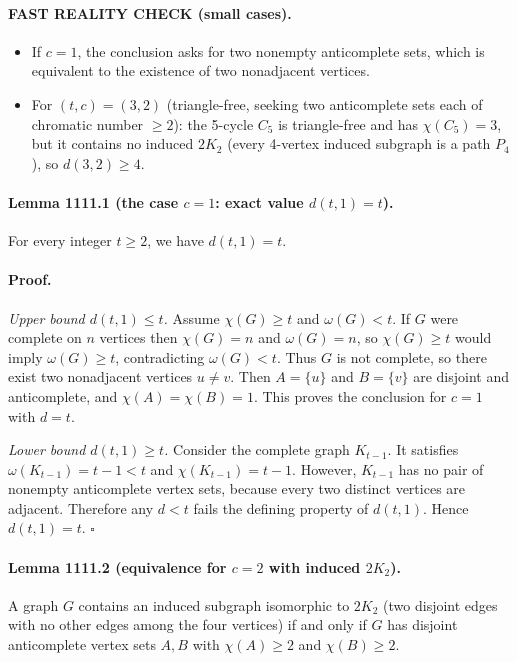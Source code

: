 \paragraph{FAST REALITY CHECK (small cases).}
\begin{itemize}
\item If $c=1$, the conclusion asks for two nonempty anticomplete sets, which is equivalent to the existence of two nonadjacent vertices.
\item For $(t,c)=(3,2)$ (triangle-free, seeking two anticomplete sets each of chromatic number $\ge 2$): the 5-cycle $C_5$ is triangle-free and has $\chi(C_5)=3$, but it contains no induced $2K_2$ (every 4-vertex induced subgraph is a path $P_4$), so $d(3,2)\ge 4$.
\end{itemize}

\paragraph{Lemma 1111.1 (the case $c=1$: exact value $d(t,1)=t$).}
For every integer $t\ge 2$, we have $d(t,1)=t$.

\paragraph{Proof.}
\emph{Upper bound $d(t,1)\le t$.}
Assume $\chi(G)\ge t$ and $\omega(G)<t$.
If $G$ were complete on $n$ vertices then $\chi(G)=n$ and $\omega(G)=n$, so $\chi(G)\ge t$ would imply $\omega(G)\ge t$, contradicting $\omega(G)<t$.
Thus $G$ is not complete, so there exist two nonadjacent vertices $u\ne v$.
Then $A=\{u\}$ and $B=\{v\}$ are disjoint and anticomplete, and $\chi(A)=\chi(B)=1$.
This proves the conclusion for $c=1$ with $d=t$.

\emph{Lower bound $d(t,1)\ge t$.}
Consider the complete graph $K_{t-1}$.
It satisfies $\omega(K_{t-1})=t-1<t$ and $\chi(K_{t-1})=t-1$.
However, $K_{t-1}$ has no pair of nonempty anticomplete vertex sets, because every two distinct vertices are adjacent.
Therefore any $d< t$ fails the defining property of $d(t,1)$.
Hence $d(t,1)=t$. \hfill $\square$

\paragraph{Lemma 1111.2 (equivalence for $c=2$ with induced $2K_2$).}
A graph $G$ contains an induced subgraph isomorphic to $2K_2$ (two disjoint edges with no other edges among the four vertices) if and only if $G$ has disjoint anticomplete vertex sets $A,B$ with $\chi(A)\ge 2$ and $\chi(B)\ge 2$.

